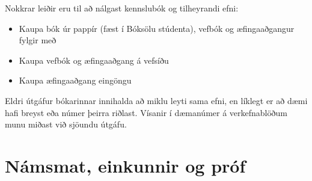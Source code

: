 \documentclass[justified, nobib]{tufte-handout}
\begin{document}
Nokkrar leiðir eru til að nálgast kennslubók og tilheyrandi efni:
\begin{itemize}
    \item Kaupa bók úr pappír (fæst í Bóksölu stúdenta), vefbók og æfingaaðgangur fylgir með
    \item Kaupa vefbók og æfingaaðgang á vefsíðu
    \item Kaupa æfingaaðgang eingöngu
\end{itemize}
Eldri útgáfur bókarinnar innihalda að miklu leyti sama efni, en líklegt er að dæmi hafi breyst eða númer þeirra riðlast. Vísanir í dæmanúmer á verkefnablöðum munu miðast við sjöundu útgáfu.

\section{Námsmat, einkunnir og próf}
\end{document}
